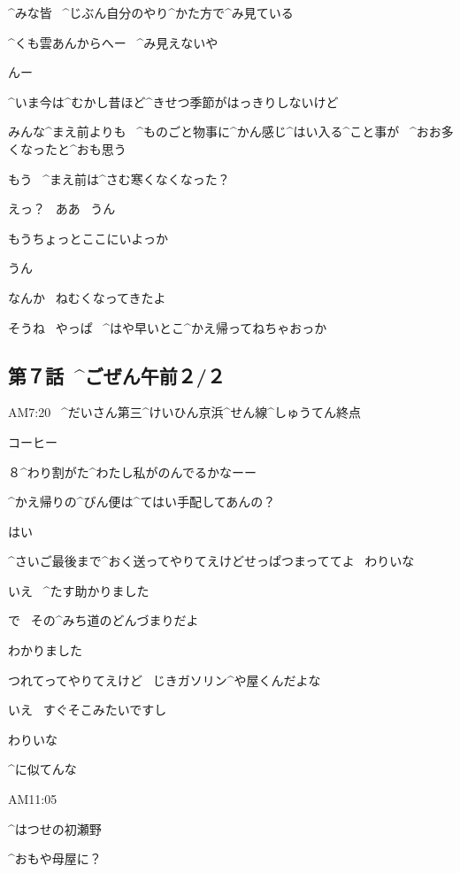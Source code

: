 \page[128]
\Alpha ^{みな}{皆}
\ ^{じぶん}{自分}のやり^{かた}{方}で^{み}{見}ている

\Person ^{くも}{雲}あんからへー
\ ^{み}{見}えないや

\Person んー

\Alpha ^{いま}{今}は^{むかし}{昔}ほど^{きせつ}{季節}がはっきりしないけど

\Alpha みんな^{まえ}{前}よりも
\ ^{ものごと}{物事}に^{かん}{感}じ^{はい}{入}る^{こと}{事}が
\ ^{おお}{多}くなったと^{おも}{思}う

\page[129]
\Takahiro もう
\ ^{まえ}{前}は^{さむ}{寒}くなくなった？

\Alpha えっ？
\ ああ
\ うん

\Alpha もうちょっとここにいよっか

\Alpha うん

\page[130]
\Takahiro なんか
\ ねむくなってきたよ

\Alpha そうね
\ やっぱ
\ ^{はや}{早}いとこ^{かえ}{帰}ってねちゃおっか


\subsection{第７話\ ^{ごぜん}{午前}２/２}

\page[132]
\Narrator AM7:20
\ ^{だいさん}{第三}^{けいひん}{京浜}^{せん}{線}^{しゅうてん}{終点}

\page[138]
\Alpha コーヒー

\Alpha ８^{わり}{割}がた^{わたし}{私}がのんでるかなーー

\page[139]
\Person ^{かえ}{帰}りの^{びん}{便}は^{てはい}{手配}してあんの？

\Kokone はい

\Person ^{さいご}{最後}まで^{おく}{送}ってやりてえけどせっぱつまっててよ
\ わりいな

\Kokone いえ
\ ^{たす}{助}かりました

\page[141]
\Ojisan で
\ その^{みち}{道}のどんづまりだよ

\Kokone わかりました

\Ojisan つれてってやりてえけど
\ じきガソリン^{や}{屋}くんだよな

\Kokone いえ
\ すぐそこみたいですし

\Ojisan わりいな

\Ojisan ^{に}{似}てんな

\page[142]
\Narrator AM11:05

\page[143]
\Kokone ^{はつせの}{初瀬野}

\page[144]
\Alpha ^{おもや}{母屋}に？

